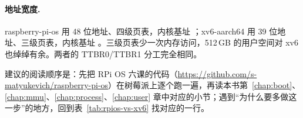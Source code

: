 \paragraph{地址宽度.} raspberry-pi-os 用 48 位地址、四级页表，内核基址 ；xv6-aarch64 用 39 位地址、三级页表，内核基址 。三级页表少一次内存访问，512\,GB 的用户空间对 xv6 也绰绰有余。两者的 TTBR0/TTBR1 分工完全相同。

建议的阅读顺序是：先把 RPi OS 六课的代码（\url{https://github.com/s-matyukevich/raspberry-pi-os}）在树莓派上逐个跑一遍，再读本书第~\ref{chap:boot}、\ref{chap:mmu}、\ref{chap:process}、\ref{chap:user} 章中对应的小节；遇到“为什么要多做这一步”的地方，回到表~\ref{tab:rpios-vs-xv6} 找对应的一行。
